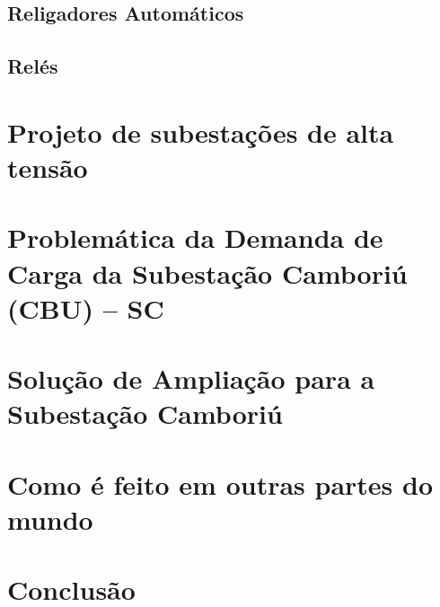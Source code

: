 \documentclass[a5paper,english,spanish,brazil]{ufsc-thesis}
\begin{document}
	\section{Religadores Automáticos}

	\section{Relés}



\chapter{Projeto de subestações de alta tensão}
\label{chap:projSEAT}
\textcolor{red}{\lipsum}

\chapter{Problemática da Demanda de Carga da Subestação Camboriú (CBU) -- SC}
\label{chap:demCarga}
\textcolor{red}{\lipsum}

\chapter{Solução de Ampliação para a Subestação Camboriú}
\label{chap:solAmp}
\textcolor{red}{\lipsum}

\chapter{Como é feito em outras partes do mundo}
\label{chap:asbuiltAbroad}
\textcolor{red}{\lipsum}

\chapter*[Conclusão]{Conclusão}
\textcolor{red}{\lipsum}


\end{document}
